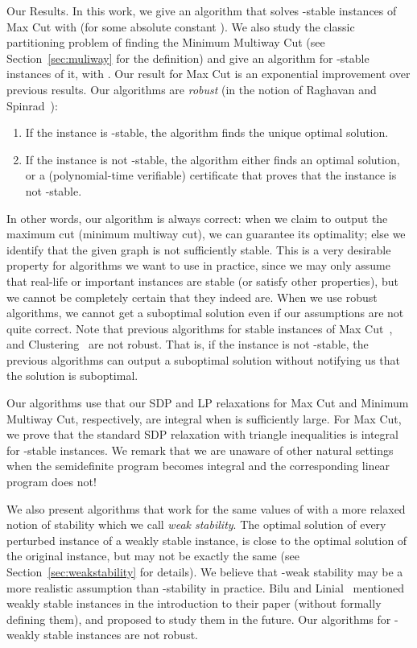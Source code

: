 \documentclass[twoside,leqno,twocolumn]{article}
\makeatletter
\def\paragraph{\@startsection  
 {paragraph}{4}{\parindent}{5pt}{-5pt}{\normalsize\bf}}
\makeatother
\begin{document}
\paragraph{Our Results.} In this work, we give an algorithm that solves -stable instances of Max Cut with  (for some absolute constant ). We also study the classic partitioning problem of finding the Minimum Multiway Cut (see Section~\ref{sec:muliway} for the definition) and give an algorithm for -stable instances of it, with . 
Our result for Max Cut is an
exponential improvement over previous results. Our algorithms are {\em robust} (in the notion of 
Raghavan and Spinrad~\cite{RS}):
\begin{enumerate}
\item If the instance is -stable, the algorithm finds the unique optimal solution.
\item If the instance is not -stable, the algorithm either finds an optimal solution, or a (polynomial-time verifiable) certificate that proves that the instance is not -stable. 
\end{enumerate}   
In other words, our algorithm is always correct: when we claim to output the maximum cut (minimum multiway cut), 
we can guarantee its optimality; else we identify that the given graph is not sufficiently stable. This is a very desirable property for algorithms we want to use in practice,
since we may only assume that real-life or important instances are stable (or satisfy other properties), but we cannot be 
completely certain that they indeed are. When we use robust algorithms, we cannot get a suboptimal solution even if our assumptions are not quite correct.
Note that previous algorithms for stable instances of Max Cut~\cite{BL,BDLS}, and Clustering~\cite{BBG,BalcanL,Awasthietal} are not robust. That is, if the instance is not -stable, the previous algorithms can output a suboptimal solution without notifying us that the 
solution is suboptimal.

Our algorithms use that our SDP and LP relaxations for Max Cut and Minimum Multiway Cut, respectively, are integral
when  is sufficiently large. 
For Max Cut, we prove that the standard SDP relaxation with triangle inequalities is integral for -stable instances.
We remark that we are unaware of other natural settings when the semidefinite program becomes integral and the corresponding linear program does not! 

We also present algorithms that work for the same values of  with a more relaxed notion of stability 
which we call {\em weak stability}.
The optimal solution of every perturbed instance of a weakly stable instance, is close to the optimal solution
of the original instance, but may not be exactly the same (see Section~\ref{sec:weakstability} for details). We believe that -weak stability may be a more realistic assumption than -stability in practice. Bilu and Linial~\cite{BL} mentioned weakly stable instances in the introduction to their paper (without formally defining them), and proposed to study them in the future.
Our algorithms for -weakly stable instances are not robust.
\end{document}
